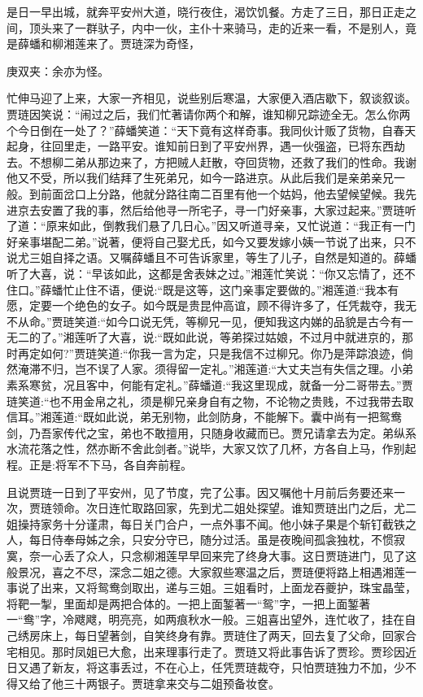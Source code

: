 \begin{parag}
    是日一早出城，就奔平安州大道，晓行夜住，渴饮饥餐。方走了三日，那日正走之间，顶头来了一群驮子，内中一伙，主仆十来骑马，走的近来一看，不是别人，竟是薛蟠和柳湘莲来了。贾琏深为奇怪，\begin{note}庚双夹：余亦为怪。\end{note}忙伸马迎了上来，大家一齐相见，说些别后寒温，大家便入酒店歇下，叙谈叙谈。贾琏因笑说：“闹过之后，我们忙著请你两个和解，谁知柳兄踪迹全无。怎么你两个今日倒在一处了？”薛蟠笑道：“天下竟有这样奇事。我同伙计贩了货物，自春天起身，往回里走，一路平安。谁知前日到了平安州界，遇一伙强盗，已将东西劫去。不想柳二弟从那边来了，方把贼人赶散，夺回货物，还救了我们的性命。我谢他又不受，所以我们结拜了生死弟兄，如今一路进京。从此后我们是亲弟亲兄一般。到前面岔口上分路，他就分路往南二百里有他一个姑妈，他去望候望候。我先进京去安置了我的事，然后给他寻一所宅子，寻一门好亲事，大家过起来。”贾琏听了道：“原来如此，倒教我们悬了几日心。”因又听道寻亲，又忙说道：“我正有一门好亲事堪配二弟。”说著，便将自己娶尤氏，如今又要发嫁小姨一节说了出来，只不说尤三姐自择之语。又嘱薛蟠且不可告诉家里，等生了儿子，自然是知道的。薛蟠听了大喜，说：“早该如此，这都是舍表妹之过。”湘莲忙笑说：“你又忘情了，还不住口。”薛蟠忙止住不语，便说:“既是这等，这门亲事定要做的。”湘莲道:“我本有愿，定要一个绝色的女子。如今既是贵昆仲高谊，顾不得许多了，任凭裁夺，我无不从命。”贾琏笑道:“如今口说无凭，等柳兄一见，便知我这内娣的品貌是古今有一无二的了。”湘莲听了大喜，说:“既如此说，等弟探过姑娘，不过月中就进京的，那时再定如何?”贾琏笑道:“你我一言为定，只是我信不过柳兄。你乃是萍踪浪迹，倘然淹滞不归，岂不误了人家。须得留一定礼。”湘莲道:“大丈夫岂有失信之理。小弟素系寒贫，况且客中，何能有定礼。”薛蟠道:“我这里现成，就备一分二哥带去。”贾琏笑道:“也不用金帛之礼，须是柳兄亲身自有之物，不论物之贵贱，不过我带去取信耳。”湘莲道:“既如此说，弟无别物，此剑防身，不能解下。囊中尚有一把鸳鸯剑，乃吾家传代之宝，弟也不敢擅用，只随身收藏而已。贾兄请拿去为定。弟纵系水流花落之性，然亦断不舍此剑者。”说毕，大家又饮了几杯，方各自上马，作别起程。正是:将军不下马，各自奔前程。
\end{parag}


\begin{parag}
    且说贾琏一日到了平安州，见了节度，完了公事。因又嘱他十月前后务要还来一次，贾琏领命。次日连忙取路回家，先到尤二姐处探望。谁知贾琏出门之后，尤二姐操持家务十分谨肃，每日关门合户，一点外事不闻。他小妹子果是个斩钉截铁之人，每日侍奉母姊之余，只安分守已，随分过活。虽是夜晚间孤衾独枕，不惯寂寞，奈一心丢了众人，只念柳湘莲早早回来完了终身大事。这日贾琏进门，见了这般景况，喜之不尽，深念二姐之德。大家叙些寒温之后，贾琏便将路上相遇湘莲一事说了出来，又将鸳鸯剑取出，递与三姐。三姐看时，上面龙吞夔护，珠宝晶莹，将靶一掣，里面却是两把合体的。一把上面錾著一“鸳”字，一把上面錾著一“鸯”字，冷飕飕，明亮亮，如两痕秋水一般。三姐喜出望外，连忙收了，挂在自己绣房床上，每日望著剑，自笑终身有靠。贾琏住了两天，回去复了父命，回家合宅相见。那时凤姐已大愈，出来理事行走了。贾琏又将此事告诉了贾珍。贾珍因近日又遇了新友，将这事丢过，不在心上，任凭贾琏裁夺，只怕贾琏独力不加，少不得又给了他三十两银子。贾琏拿来交与二姐预备妆奁。
\end{parag}


